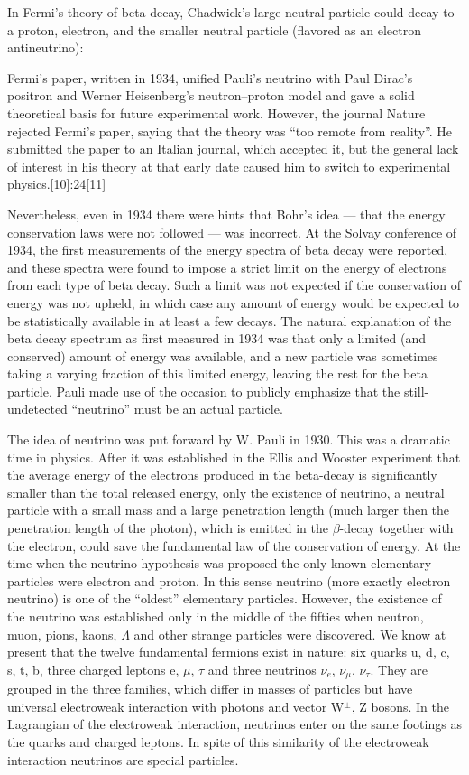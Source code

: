 In Fermi's theory of beta decay, Chadwick's large neutral particle could decay to a proton, %
electron, and the smaller neutral particle (flavored as an electron antineutrino):

Fermi's paper, written in 1934, unified Pauli's neutrino with %
Paul Dirac's positron and Werner Heisenberg's neutron–proton model and gave a %
solid theoretical basis for future experimental work.
However, the journal Nature rejected Fermi's paper, saying that the %
theory was ``too remote from reality''.
He submitted the paper to an Italian journal, which accepted it, %
but the general lack of interest in his theory at that early date caused him to %
switch to experimental physics.[10]:24[11]

Nevertheless, even in 1934 there were hints that Bohr's idea — %
that the energy conservation laws were not followed — was incorrect.
At the Solvay conference of 1934, the first measurements of the energy %
spectra of beta decay were reported, and these spectra were found to impose a %
strict limit on the energy of electrons from each type of beta decay.
Such a limit was not expected if the conservation of energy was not upheld, %
in which case any amount of energy would be expected to be statistically available %
in at least a few decays.
The natural explanation of the beta decay spectrum as first measured in 1934 %
was that only a limited (and conserved) amount of energy was available, %
and a new particle was sometimes taking a varying fraction of this limited energy, %
leaving the rest for the beta particle.
Pauli made use of the occasion to publicly emphasize that the still-undetected %
``neutrino'' must be an actual particle.

The idea of neutrino was put forward by W. Pauli in 1930.
This was a dramatic time in physics.
After it was established in the Ellis and Wooster experiment that %
the average energy of the electrons produced in the beta-decay is significantly smaller %
than the total released energy, only the existence of neutrino, a neutral particle with %
a small mass and a large penetration length (much larger then the penetration length %
of the photon), which is emitted in the $\beta$-decay together with the electron, could %
save the fundamental law of the conservation of energy. 
At the time when the neutrino hypothesis was proposed the only known elementary %
particles were electron and proton. In this sense neutrino (more exactly electron %
neutrino) is one of the “oldest” elementary particles.
However, the existence of the %
neutrino was established only in the middle of the fifties when neutron, muon, pions, %
kaons, $\Lambda$ and other strange particles were discovered.
We know at present that the twelve fundamental fermions exist in nature: six %
quarks u, d, c, s, t, b, three charged leptons e, $\mu$, $\tau$ and three neutrinos $\nu_e$, %
$\nu_\mu$, $\nu_\tau$.
They are grouped in the three families, which differ in masses of particles but have %
universal electroweak interaction with photons and vector W$^\pm$, Z bosons.
In the Lagrangian of the electroweak interaction, neutrinos enter on the same footings %
as the quarks and charged leptons.
In spite of this similarity of the electroweak %
interaction neutrinos are special particles. 


